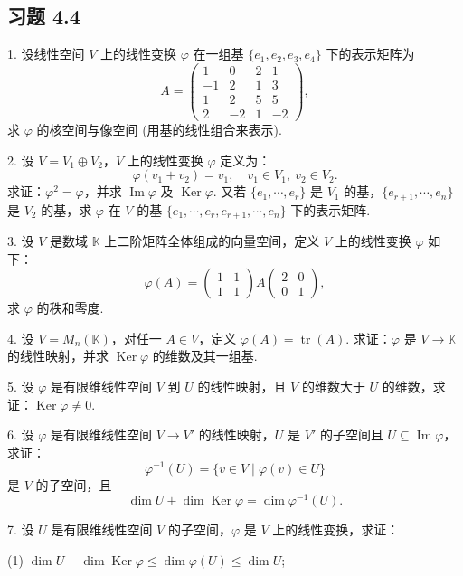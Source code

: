 \documentclass[UTF8, 12pt, fontset=fandol, oneside]{ctexart}
\begin{document}
\subsection*{习题 4.4}

1. 设线性空间 $V$ 上的线性变换 $\varphi$ 在一组基 $\{e_1,e_2,e_3,e_4\}$ 下的表示矩阵为
\[
A=\left(\begin{array}{rrrr}
1 & 0 & 2 & 1\\
-1 & 2 & 1 & 3\\
1 & 2 & 5 & 5\\
2 & -2 & 1 & -2
\end{array}\right),
\]
求 $\varphi$ 的核空间与像空间 (用基的线性组合来表示).

2. 设 $V=V_1\oplus V_2$，$V$ 上的线性变换 $\varphi$ 定义为：
\[
\varphi(v_1+v_2)=v_1,\quad v_1\in V_1,\ v_2\in V_2.
\]
求证：$\varphi^2=\varphi$，并求 $\operatorname{Im}\varphi$ 及 $\operatorname{Ker}\varphi$. 又若 $\{e_1,\cdots,e_r\}$ 是 $V_1$ 的基，$\{e_{r+1},\cdots,e_n\}$ 是 $V_2$ 的基，求 $\varphi$ 在 $V$ 的基 $\{e_1,\cdots,e_r,e_{r+1},\cdots,e_n\}$ 下的表示矩阵.

3. 设 $V$ 是数域 $\mathbb{K}$ 上二阶矩阵全体组成的向量空间，定义 $V$ 上的线性变换 $\varphi$ 如下：
\[
\varphi(A)=
\left(\begin{array}{cc}
1 & 1\\
1 & 1
\end{array}\right)
A
\left(\begin{array}{cc}
2 & 0\\
0 & 1
\end{array}\right),
\]
求 $\varphi$ 的秩和零度.

4. 设 $V=M_n(\mathbb{K})$，对任一 $A\in V$，定义 $\varphi(A)=\operatorname{tr}(A)$. 求证：$\varphi$ 是 $V\to\mathbb{K}$ 的线性映射，并求 $\operatorname{Ker}\varphi$ 的维数及其一组基.

5. 设 $\varphi$ 是有限维线性空间 $V$ 到 $U$ 的线性映射，且 $V$ 的维数大于 $U$ 的维数，求证：$\operatorname{Ker}\varphi\neq 0$.

6. 设 $\varphi$ 是有限维线性空间 $V\to V'$ 的线性映射，$U$ 是 $V'$ 的子空间且 $U\subseteq\operatorname{Im}\varphi$，求证：
\[
\varphi^{-1}(U)=\{v\in V\mid \varphi(v)\in U\}
\]
是 $V$ 的子空间，且
\[
\dim U+\dim\operatorname{Ker}\varphi=\dim\varphi^{-1}(U).
\]

7. 设 $U$ 是有限维线性空间 $V$ 的子空间，$\varphi$ 是 $V$ 上的线性变换，求证：

(1) $\dim U-\dim\operatorname{Ker}\varphi\leq \dim\varphi(U)\leq \dim U$;
\end{document}
